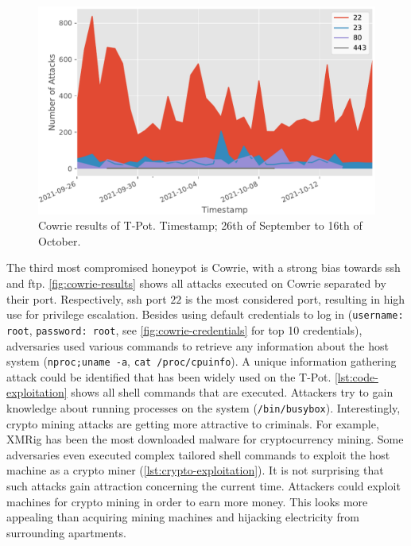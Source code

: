 \begin{figure}
    \centering
    \includegraphics[width=\textwidth]{figures/tpot-cowrie-port.pdf}
    \caption[Cowrie results of T-Pot]{
        Cowrie results of T-Pot.
        Timestamp; 26th of September to 16th of October.
    }
    \label{fig:cowrie-results}
\end{figure}

The third most compromised honeypot is Cowrie, with a strong bias towards \ac{ssh} and \ac{ftp}.
\autoref{fig:cowrie-results} shows all attacks executed on Cowrie separated by their port.
Respectively, \ac{ssh} port $22$ is the most considered port, resulting in high use for privilege escalation.
Besides using default credentials to log in (\verb|username: root|, \verb|password: root|, see \autoref{fig:cowrie-credentials} for top 10 credentials), adversaries used various commands to retrieve any information about the host system (\verb|nproc;uname -a|, \verb|cat /proc/cpuinfo|).
A unique information gathering attack could be identified that has been widely used on the T-Pot.
\autoref{lst:code-exploitation} shows all shell commands that are executed.
Attackers try to gain knowledge about running processes on the system (\verb|/bin/busybox|).
Interestingly, crypto mining attacks are getting more attractive to criminals.
For example, XMRig has been the most downloaded malware for cryptocurrency mining.
Some adversaries even executed complex tailored shell commands to exploit the host machine as a crypto miner (\autoref{lst:crypto-exploitation}).
It is not surprising that such attacks gain attraction concerning the current time.
Attackers could exploit machines for crypto mining in order to earn more money.
This looks more appealing than acquiring mining machines and hijacking electricity from surrounding apartments.

